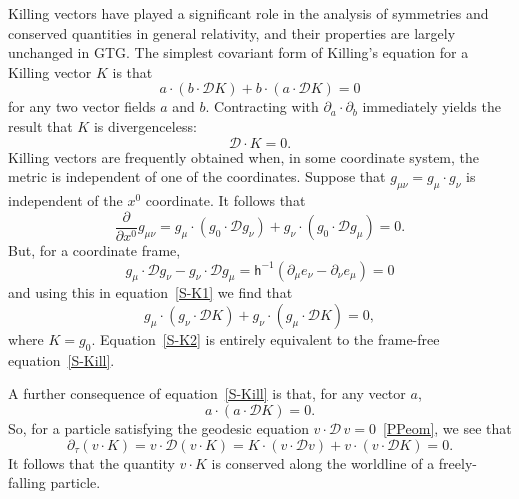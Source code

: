 \documentclass[a4paper]{article}
\numberwithin{equation}{section}
\newcommand{\dt}{\! \cdot \!}
\newcommand{\cld}{{\mathcal{D}}}
\newcommand{\da}{\partial_a}
\newcommand{\db}{\partial_b}
\newcommand{\lih}{\mathsf{h}}
\newcommand{\hu}{\lih}
\newcommand{\deriv}[2]{\frac{\partial #1}{\partial #2}}
\begin{document}
Killing vectors have played a significant role in the analysis of
symmetries and conserved quantities in general relativity, and their
properties are largely unchanged in GTG.  The simplest
covariant form of Killing's equation for a Killing vector $K$ is that 
%
\begin{equation}
a \dt (b \dt \cld K) + b \dt (a \dt \cld K) = 0
\label{S-Kill}
\end{equation}
%
for any two vector fields $a$ and $b$.  Contracting with $\da\cdot\db$
immediately yields the result that $K$ is divergenceless:
%
\begin{equation}
\cld \dt K = 0.
\end{equation}
%
Killing vectors are frequently obtained when, in some coordinate
system, the metric is independent of one of the coordinates.  Suppose
that $g_{\mu\nu} = g_\mu \cdot g_\nu$ is independent of the $x^0$
coordinate.  It follows that
%
\begin{equation}
\deriv{}{x^0} g_{\mu\nu} = g_\mu \dt (g_0 \dt\cld g_\nu) + g_\nu \dt
(g_0 \dt \cld g_\mu) = 0.
\label{S-K1}
\end{equation}
%
But, for a coordinate frame, 
%
\begin{equation}
g_\mu \dt \cld g_\nu - g_\nu \dt \cld g_\mu = \hu^{-1} (\partial_\mu
e_\nu - \partial_\nu e_\mu) = 0
\end{equation}
%
and using this in equation~\eqref{S-K1} we find that
%
\begin{equation}
g_\mu \dt (g_\nu \dt \cld K) + g_\nu \dt ( g_\mu \dt \cld K) = 0,
\label{S-K2}
\end{equation}
%
where $K=g_0$.  Equation~\eqref{S-K2} is entirely equivalent to the
frame-free equation~\eqref{S-Kill}.  


A further consequence of equation~\eqref{S-Kill} is that, for any vector
$a$, 
%
\begin{equation}
a \dt (a \dt \cld K) = 0.  
\end{equation}
%
So, for a particle satisfying the geodesic equation $v\dt \cld \,
v=0$~\eqref{PPeom}, we see that
%
\begin{equation}
\partial_\tau (v\dt K) = v \dt \cld (v \dt K) = K \dt (v \dt \cld v) +
v \dt (v \dt \cld K) = 0.
\end{equation}
%
It follows that the quantity $v\cdot K$ is conserved along the worldline
of a freely-falling particle.  



\newpage

\vspace*{5cm} 
\end{document}
